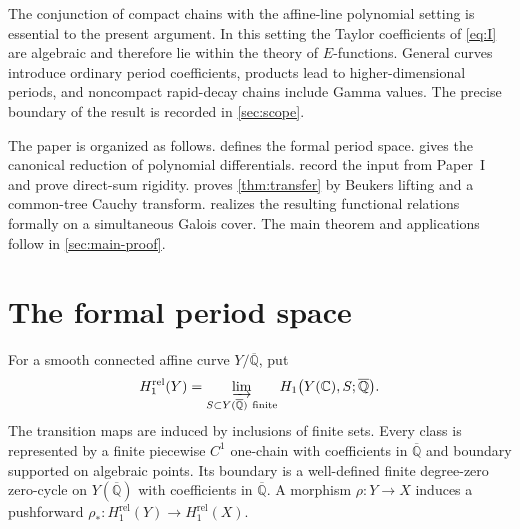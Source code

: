 \documentclass[11pt]{article}
\numberwithin{equation}{section}
\theoremstyle{definition}
\theoremstyle{remark}
\newcommand{\C}{\mathbb C}
\newcommand{\Qbar}{\overline{\mathbb Q}}
\begin{document}
The conjunction of compact chains with the affine-line polynomial setting
is essential to the present argument.  In this setting the Taylor
coefficients of \eqref{eq:I} are algebraic and therefore lie within the
theory of $E$-functions.  General curves introduce ordinary period coefficients,
products lead to higher-dimensional periods, and noncompact rapid-decay
chains include Gamma values.  The precise boundary of the result is
recorded in \cref{sec:scope}.

The paper is organized as follows.   defines the
formal period space.   gives the canonical reduction of
polynomial differentials.   record
the input from Paper~I and prove direct-sum rigidity.
 proves \cref{thm:transfer} by Beukers lifting and a
common-tree Cauchy transform.   realizes the
resulting functional relations formally on a simultaneous Galois cover.
The main theorem and applications follow in \cref{sec:main-proof}.

\section{The formal period space}\label{sec:formal-space}

For a smooth connected affine curve $Y/\Qbar$, put
\begin{equation}\label{eq:relative-homology}
  H_1^{\mathrm{rel}}(Y)
  =\varinjlim_{S\subset Y(\Qbar)\ \mathrm{finite}}
    H_1\bigl(Y(\C),S;\Qbar\bigr).
\end{equation}
The transition maps are induced by inclusions of finite sets.  Every class
is represented by a finite piecewise $C^1$ one-chain with coefficients in
$\Qbar$ and boundary supported on algebraic points.  Its boundary is a
well-defined finite degree-zero zero-cycle on $Y(\Qbar)$ with coefficients
in $\Qbar$.  A morphism $\rho:Y\to X$ induces a pushforward
$\rho_*:H_1^{\mathrm{rel}}(Y)\to H_1^{\mathrm{rel}}(X)$.
\end{document}
